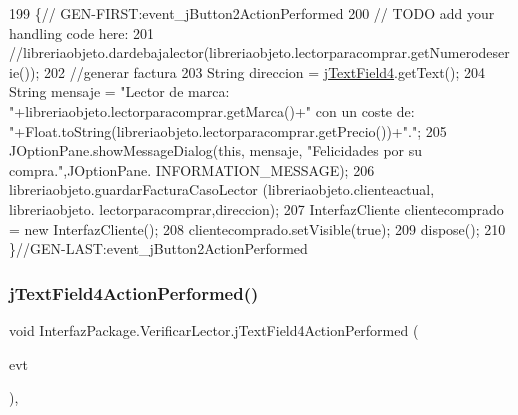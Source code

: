 \begin{DoxyCode}
199                                                                          \{\textcolor{comment}{//
      GEN-FIRST:event\_jButton2ActionPerformed}
200         \textcolor{comment}{// TODO add your handling code here:}
201         \textcolor{comment}{//libreriaobjeto.dardebajalector(libreriaobjeto.lectorparacomprar.getNumerodeserie());}
202         \textcolor{comment}{//generar factura}
203         String direccion = \mbox{\hyperlink{class_interfaz_package_1_1_verificar_lector_a782676dc9af3fa99d3a06020501824f7}{jTextField4}}.getText();
204         String mensaje = \textcolor{stringliteral}{"Lector de marca: "}+libreriaobjeto.lectorparacomprar.getMarca()+\textcolor{stringliteral}{" con un coste de:
       "}+Float.toString(libreriaobjeto.lectorparacomprar.getPrecio())+\textcolor{stringliteral}{"."};
205         JOptionPane.showMessageDialog(\textcolor{keyword}{this}, mensaje, \textcolor{stringliteral}{"Felicidades por su compra."},JOptionPane.
      INFORMATION\_MESSAGE);
206         libreriaobjeto.guardarFacturaCasoLector (libreriaobjeto.clienteactual, libreriaobjeto.
      lectorparacomprar,direccion);
207         InterfazCliente clientecomprado = \textcolor{keyword}{new} InterfazCliente();
208         clientecomprado.setVisible(\textcolor{keyword}{true});
209         dispose();
210     \}\textcolor{comment}{//GEN-LAST:event\_jButton2ActionPerformed}
\end{DoxyCode}
\mbox{\label{class_interfaz_package_1_1_verificar_lector_a701cb158bcbf5e7944c26e7980de4cb6}} 
\subsubsection{\texorpdfstring{j\+Text\+Field4\+Action\+Performed()}{jTextField4ActionPerformed()}}
{\footnotesize\ttfamily void Interfaz\+Package.\+Verificar\+Lector.\+j\+Text\+Field4\+Action\+Performed (\begin{DoxyParamCaption}\item[{java.\+awt.\+event.\+Action\+Event}]{evt }\end{DoxyParamCaption})\hspace{0.3cm}{\ttfamily [inline]}, {\ttfamily [private]}}


